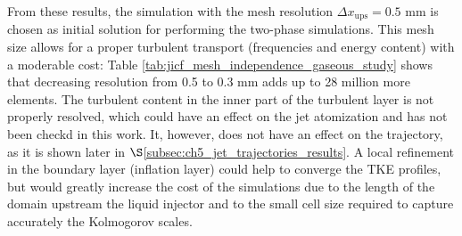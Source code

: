 From these results, the simulation with the mesh resolution $\Delta x_\mathrm{ups} = 0.5$ mm is chosen as initial solution for performing the two-phase simulations. This mesh size allows for a proper turbulent transport (frequencies and energy content) with a moderable cost: Table \ref{tab:jicf_mesh_independence_gaseous_study} shows that decreasing resolution from 0.5 to 0.3 mm adds up to 28 million more elements. The turbulent content in the inner part of the turbulent layer is not properly resolved, which could have an effect on the jet atomization and has not been checkd in this work. It, however, does not have an effect on the trajectory, as it is shown later in $\S$\ref{subsec:ch5_jet_trajectories_results}. A local refinement in the boundary layer (inflation layer) could help to converge the TKE profiles, but would greatly increase the cost of the simulations due to the length of the domain upstream the liquid injector and to the small cell size required to capture accurately the Kolmogorov scales.









